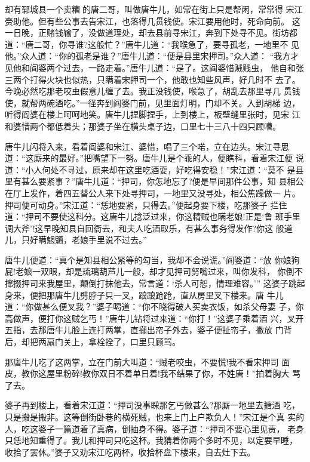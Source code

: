 却有郓城县一个卖糟的唐二哥，叫做唐牛儿，如常在街上只是帮闲，常常得
宋江赍助他。但有些公事去告宋江，也落得几贯钱使。宋江要用他时，死命向前。
这一日晚，正赌钱输了，没做道理处，却去县前寻宋江，奔到下处寻不见。街坊都
道：“唐二哥，你寻谁?这般忙？”唐牛儿道：“我喉急了，要寻孤老，一地里不
见他。”众人道：“你的孤老是谁？”唐牛儿道：“便是县里宋押司。”众人道：
“我方才见他和阎婆两个过去，一路走着。”唐牛儿道：“是了。这阎婆惜贼贱虫，
他自和张三两个打得火块也似热，只瞒着宋押司一个，他敢也知些风声，好几时不
去了。今晚必然吃那老咬虫假意儿缠了去。我正没钱使，喉急了，胡乱去那里寻几
贯钱使，就帮两碗酒吃。”一径奔到阎婆门前，见里面灯明，门却不关。入到胡梯
边，听得阎婆在楼上呵呵地笑。唐牛儿捏脚捏手，上到楼上，板壁缝里张时，见宋
江和婆惜两个都低着头；那婆子坐在横头桌子边，口里七十三八十四只顾嘈。

唐牛儿闪将入来，看着阎婆和宋江、婆惜，唱了三个喏，立在边头。宋江寻思
道：“这厮来的最好。”把嘴望下一努。唐牛儿是个乖的人，便瞧科，看着宋江便
说道：“小人何处不寻过，原来却在这里吃酒耍，好吃得安稳！”宋江道：“莫不
是县里有甚么要紧事？”唐牛儿道：“押司，你怎地忘了?便是早间那件公事，知
县相公在厅上发作，着四五替公人来下处寻押司，一地里又没寻处，相公焦躁做一
片。押司便可动身。”宋江道：“恁地要紧，只得去。”便起身要下楼，吃那婆子
拦住道：“押司不要使这科分。这唐牛儿捻泛过来，你这精贼也瞒老娘!正是‘鲁
班手里调大斧’!这早晚知县自回衙去，和夫人吃酒取乐，有甚么事务得发作?你这
般道儿，只好瞒魍魉，老娘手里说不过去。”

唐牛儿便道：“真个是知县相公紧等的勾当，我却不会说谎。”阎婆道：“放
你娘狗屁!老娘一双眼，却是琉璃葫芦儿一般，却才见押司努嘴过来，叫你发科，
你倒不撺掇押司来我屋里，颠倒打抹他去，常言道：‘杀人可恕，情理难容。’”
这婆子跳起身来，便把那唐牛儿劈脖子只一叉，踉踉跄跄，直从房里叉下楼来。唐
牛儿道：“你做甚么便叉我？”婆子喝道：“你不晓得破人买卖衣饭，如杀父母妻
子，你高做声，便打你这贼乞丐！”唐牛儿钻将过来道：“你打！”这婆子乘着酒
兴，叉开五指，去那唐牛儿脸上连打两掌，直攧出帘子外去，婆子便扯帘子，撇放
门背后，却把两扇门关上，拿栓拴了，口里只顾骂。

那唐牛儿吃了这两掌，立在门前大叫道：“贼老咬虫，不要慌!我不看宋押司
面皮，教你这屋里粉碎!教你双日不着单日着!我不结果了你，不姓唐！”拍着胸大
骂了去。

婆子再到楼上，看着宋江道：“押司没事睬那乞丐做甚么?那厮一地里去搪酒
吃，只是搬是搬非。这等倒街卧巷的横死贼，也来上门上户欺负人！”宋江是个真
实的人，吃这婆子一篇道着了真病，倒抽身不得。婆子道：“押司不要心里见责，
老身只恁地知重得了。我儿和押司只吃这杯。我猜着你两个多时不见，以定要早睡，
收拾了罢休。”婆子又劝宋江吃两杯，收拾杯盘下楼来，自去灶下去。


